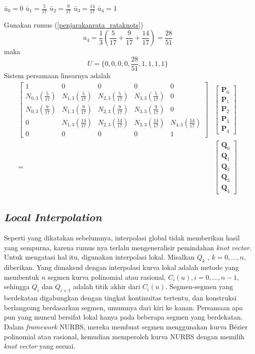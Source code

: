 \centerline{$\bar{u}_0 = 0$ \quad
$\bar{u}_1 = \frac{5}{17}$ \quad
$\bar{u}_2 = \frac{9}{17}$ \quad
$\bar{u}_3 = \frac{14}{17}$ \quad
$\bar{u}_4 = 1$}
Gunakan rumus (\ref{penjarakanrata_rataknots})
\[u_4 = \frac{1}{3}(\frac{5}{17}+\frac{9}{17}+\frac{14}{17})=\frac{28}{51} \]
maka \[U = \{0,0,0,0,\frac{28}{51},1,1,1,1\}\]
Sistem persamaan linearnya adalah
\[ \begin{split}
	\begin{bmatrix}
	1 & 0 & 0 & 0 & 0\\ 
	N_{0,3}(\frac{5}{17}) & N_{1,3}(\frac{5}{17}) & N_{2,3}(\frac{5}{17}) & N_{3,3}(\frac{5}{17}) & 0\\ 
	N_{0,3}(\frac{9}{17}) & N_{1,3}(\frac{9}{17}) & N_{2,3}(\frac{9}{17}) & N_{3,3}(\frac{9}{17}) & 0\\ 
	0 & N_{1,3}(\frac{14}{17}) & N_{2,3}(\frac{14}{17}) & N_{3,3}(\frac{14}{17}) & N_{4,3}(\frac{14}{17})\\ 
	0 & 0 & 0 & 0 & 1
	\end{bmatrix} &
	\begin{bmatrix}
		\textbf{P}_0 \\
		\textbf{P}_1 \\
		\textbf{P}_2 \\
		\textbf{P}_3 \\
		\textbf{P}_4 
	\end{bmatrix}
	\\
	= & \begin{bmatrix}
		\textbf{Q}_0 \\
		\textbf{Q}_1 \\
		\textbf{Q}_2 \\
		\textbf{Q}_3 \\
		\textbf{Q}_4
	\end{bmatrix}
	\end{split}
\]

\subsection{\emph{Local Interpolation}}

Seperti yang dikatakan sebelumnya, interpolasi global 
tidak memberikan hasil yang sempurna, karena rumus nya terlalu 
mengeneralisir pemindahan \textit{knot vector}. 
Untuk mengatasi hal itu, 
digunakan interpolasi lokal. Misalkan {$Q_k$} , $k = 0, ..., n$, 
diberikan. Yang dimaksud dengan interpolasi kurva lokal adalah 
metode yang membentuk $n$ segmen kurva polinomial atau rasional, 
$C_{i}(u), i = 0, ..., n - 1$, sehingga $Q_i$ dan $Q_{i+1}$ 
adalah titik akhir dari $C_{i}(u)$. Segmen-segmen yang 
berdekatan digabungkan dengan tingkat kontinuitas 
tertentu, dan konstruksi berlangsung berdasarkan segmen, 
umumnya dari kiri ke kanan. Persamaan apa pun yang muncul 
bersifat lokal hanya pada beberapa segmen yang berdekatan. 
Dalam \textit{framework} NURBS, mereka membuat segmen menggunakan 
kurva Bézier polinomial atau rasional, kemudian memperoleh 
kurva NURBS dengan memilih \textit{knot vector} yang sesuai.

